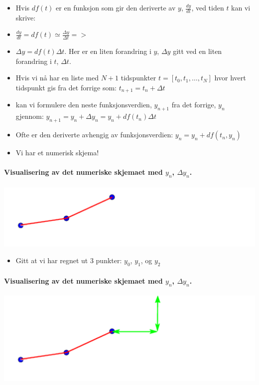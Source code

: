 \documentclass[%
oneside,                 %
final,                   %
10pt,norsk]{article}
\begin{document}
\noindent
\begin{itemize}
\item Hvis $df(t)$ er en funksjon som gir den deriverte av $y$, $\frac{dy}{dt}$, ved tiden $t$ kan vi skrive:

\item $\frac{dy}{dt}=df(t)\simeq \frac{\Delta y}{\Delta t}=>$

\item $\Delta y = df(t) \Delta t$. Her er en liten forandring i $y$, $\Delta y$ gitt ved en liten forandring i $t$, $\Delta t$.

\item Hvis vi nå har en liste med $N+1$ tidspunkter $t=[t_0, t_1, \ldots, t_N]$ hvor hvert tidspunkt gis fra det forrige som: $t_{n+1}=t_n+\Delta t$

\item kan vi formulere den neste funksjonsverdien, $y_{n+1}$ fra det forrige, $y_{n}$ gjennom: $y_{n+1}=y_n+\Delta y_n=y_n+df(t_n) \Delta t$

\item Ofte er den deriverte avhengig av funksjonsverdien: $y_n=y_n+df(t_n, y_n)$

\item Vi har et numerisk skjema!
\end{itemize}

\noindent


\paragraph{Visualisering av det numeriske skjemaet med $y_n$, $\Delta y_n$.}
\centerline{\includegraphics[width=0.9\linewidth]{fig/diskret_funksjon_0.pdf}}



\begin{itemize}
\item Gitt at vi har regnet ut 3 punkter: $y_0$, $y_1$, og $y_2$
\end{itemize}

\noindent
\paragraph{Visualisering av det numeriske skjemaet med $y_n$, $\Delta y_n$.}
\centerline{\includegraphics[width=0.9\linewidth]{fig/diskret_funksjon_1.pdf}}
\end{document}

